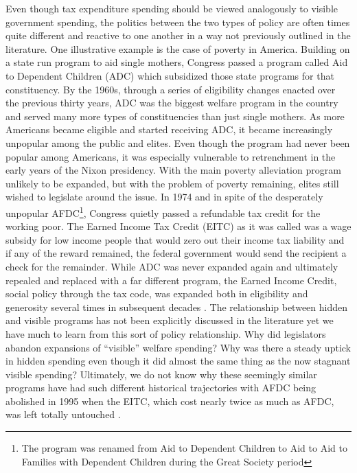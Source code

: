 \documentclass[12pt]{article}
\begin{document}
Even though tax expenditure spending should be viewed analogously to visible government spending, the politics between the two types of policy are often times quite different and reactive to one another in a way not previously outlined in the literature. One illustrative example is the case of poverty in America. Building on a state run program to aid single mothers, Congress passed a program called Aid to Dependent Children (ADC) which subsidized  those state programs for that constituency. By the 1960s, through a series of eligibility changes enacted over the previous thirty years, ADC was the biggest welfare program in the country and served many more types of constituencies than just single mothers. As more Americans became eligible and started receiving ADC, it became increasingly unpopular among the public and elites. Even though the program had never been popular among Americans, it was especially vulnerable to retrenchment in the early years of the Nixon presidency. With the main poverty alleviation program unlikely to be expanded, but with the problem of poverty remaining, elites still wished to legislate around the issue. In 1974 and in spite of the desperately unpopular AFDC\footnote{The program was renamed from Aid to Dependent Children to Aid to Aid to Families with Dependent Children during the Great Society period}, Congress quietly passed a refundable tax credit for the working poor. The Earned Income Tax Credit (EITC) as it was called was a wage subsidy for low income people that would zero out their income tax liability and if any of the reward remained, the federal government would send the recipient a check for the remainder. While ADC was never expanded again and ultimately repealed and replaced with a far different program, the Earned Income Credit, social policy through the tax code, was expanded both in eligibility and generosity several times in subsequent decades \citep{stewart1991}.  The relationship between hidden and visible programs has not been  explicitly discussed in the literature yet we have much to learn from this sort of policy relationship. Why did legislators abandon expansions of ``visible'' welfare spending? Why was there a steady uptick in hidden spending even though it did almost the same thing as the now stagnant visible spending? Ultimately, we do not know why these seemingly similar programs have had such different historical trajectories with AFDC being abolished in 1995 when the EITC, which cost nearly twice as much as AFDC, was left totally untouched \citep{myles1997}.
\end{document}
